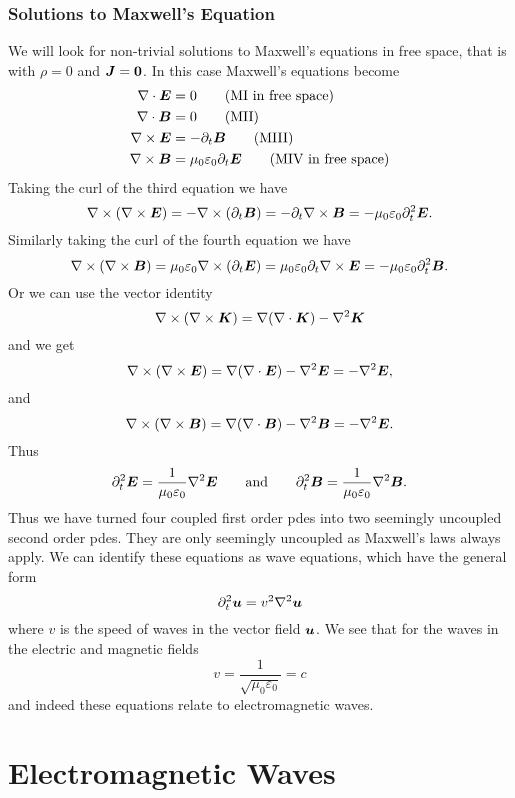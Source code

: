     \subsubsection{Solutions to Maxwell's Equation}
    We will look for non-trivial solutions to Maxwell's equations in free space, that is with \(\rho = 0\) and \(\bm{J} = \bm{0}\).
    In this case Maxwell's equations become
    \begin{align*}
        \nabla\cdot\bm{E} &= 0\tag{MI in free space}\\
        \nabla\cdot\bm{B} &= 0\tag{MII}\\
        \nabla\times\bm{E} &= -\partial_t\bm{B}\tag{MIII}\\
        \nabla\times\bm{B} &= \mu_0\varepsilon_0\partial_t\bm{E}\tag{MIV in free space}
    \end{align*}
    Taking the curl of the third equation we have
    \[\nabla\times(\nabla\times\bm{E}) = -\nabla\times(\partial_t\bm{B}) = -\partial_t\nabla\times\bm{B} = -\mu_0\varepsilon_0\partial_t^2\bm{E}.\]
    Similarly taking the curl of the fourth equation we have
    \[\nabla\times(\nabla\times\bm{B}) = \mu_0\varepsilon_0\nabla\times(\partial_t\bm{E}) = \mu_0\varepsilon_0\partial_t\nabla\times\bm{E} = -\mu_0\varepsilon_0\partial_t^2\bm{B}.\]
    Or we can use the vector identity
    \[\nabla\times(\nabla\times\bm{K}) = \nabla(\nabla\cdot\bm{K}) - \nabla^2\bm{K}\]
    and we get
    \[\nabla\times(\nabla\times\bm{E}) = \nabla(\nabla\cdot\bm{E}) - \nabla^2\bm{E} = -\nabla^2\bm{E},\]
    and
    \[\nabla\times(\nabla\times\bm{B}) = \nabla(\nabla\cdot\bm{B})  -\nabla^2\bm{B} = -\nabla^2\bm{E}.\]
    Thus
    \[\partial_t^2\bm{E} = \frac{1}{\mu_0\varepsilon_0}\nabla^2\bm{E}\qquad\text{and}\qquad \partial_t^2\bm{B} = \frac{1}{\mu_0\varepsilon_0}\nabla^2\bm{B}.\]
    Thus we have turned four coupled first order \glspl{pde} into two seemingly uncoupled second order \glspl{pde}.
    They are only seemingly uncoupled as Maxwell's laws always apply.
    We can identify these equations as wave equations, which have the general form
    \[\partial_t^2\bm{u} = v^2\nabla^2\bm{u}\]
    where \(v\) is the speed of waves in the vector field \(\bm{u}\).
    We see that for the waves in the electric and magnetic fields
    \[v = \frac{1}{\sqrt{\mu_0\varepsilon_0}} = c\]
    and indeed these equations relate to electromagnetic waves.
    
    \section{Electromagnetic Waves}
